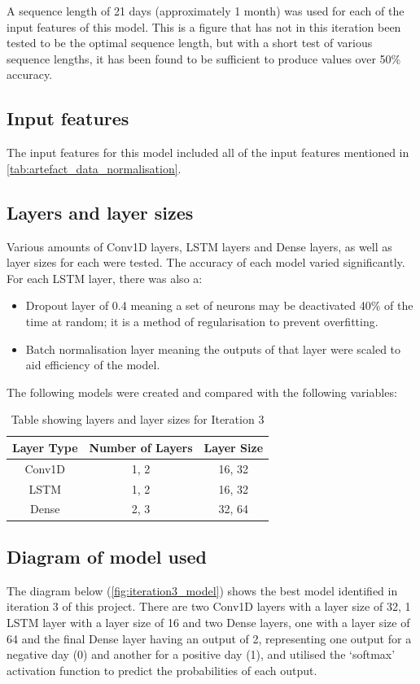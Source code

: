 A sequence length of 21 days (approximately 1 month) was used for each of the input features of this model.
This is a figure that has not in this iteration been tested to be the optimal sequence length, but with a short
test of various sequence lengths, it has been found to be sufficient to produce values over 50\% accuracy.

\subsection{Input features}
The input features for this model included all of the input features mentioned in \autoref{tab:artefact_data_normalisation}.

\subsection{Layers and layer sizes} \label{ssec:iteration3layers}
Various amounts of Conv1D layers, LSTM layers and Dense layers, as well as layer sizes for each were tested. The accuracy of each model varied
significantly. For each LSTM layer, there was also a:
\begin{itemize}
    \item Dropout layer of 0.4 meaning a set of neurons may be
    deactivated 40\% of the time at random; it is a method of regularisation to prevent overfitting.
    \item Batch normalisation layer meaning the outputs of that layer were scaled to aid efficiency of the model.
\end{itemize}

The following models were created and compared with the following variables:

\begin{table}[ht]
    \centering
    \begin{tabular}{|c|c|c|}
        \hline
        Layer Type & Number of Layers & Layer Size \\
        \hline\hline
        Conv1D & 1, 2 & 16, 32 \\
        LSTM & 1, 2 & 16, 32 \\
        Dense & 2, 3 & 32, 64 \\
        \hline
    \end{tabular}
    \caption{Table showing layers and layer sizes for Iteration 3}
    \label{tab:iteration3_layers}
\end{table}
\FloatBarrier

\subsection{Diagram of model used}
The diagram below (\autoref{fig:iteration3_model}) shows the best model identified in iteration 3 of this project.
There are two Conv1D layers with a layer size of 32, 1 LSTM layer with a layer size of 16 and two Dense layers, one
with a layer size of 64 and the final Dense layer having an output of 2, representing one output for
a negative day (0) and another for a positive day (1), and utilised the `softmax' activation function to predict the
probabilities of each output.

